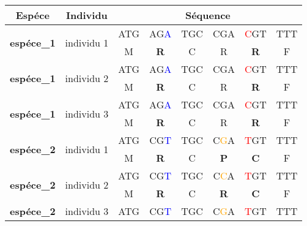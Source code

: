 \documentclass[../main]{subfiles} %
\begin{document}



\begin{table}[]
    \centering
    \begin{tabular}{cccccccc}
        \toprule
        \textbf{Espéce}                     & \textbf{Individu}             & \multicolumn{6}{c}{\textbf{Séquence}} \\
        \midrule
        \multirow{2}{*}{\textbf{espéce\_1}} & \multirow{2}{*}{individu   1} & ATG  & AG\textcolor{blue}{A}  & TGC  & CGA  & \textcolor{red}{C}GT & TTT \\
                                            &                               & M    & \textbf{R}    & C    & R    & \textbf{R}   & F   \\
        \midrule
        \multirow{2}{*}{\textbf{espéce\_1}} & \multirow{2}{*}{individu 2}   & ATG  & AG\textcolor{blue}{A} & TGC  & CGA  & \textcolor{red}{C}GT & TTT \\
                                            &                               & M    & \textbf{R}    & C    & R    & \textbf{R}   & F   \\
        \midrule
        \multirow{2}{*}{\textbf{espéce\_1}} & \multirow{2}{*}{individu 3}   & ATG  & AG\textcolor{blue}{A}  & TGC  & CGA  & \textcolor{red}{C}GT & TTT \\
                                            &                               & M    & \textbf{R}    & C    & R    & \textbf{R}   & F   \\
        \midrule
        \multirow{2}{*}{\textbf{espéce\_2}} & \multirow{2}{*}{individu 1}   & ATG  & CG\textcolor{blue}{T}  & TGC  & C\textcolor{orange}{G}A  & \textcolor{red}{T}GT & TTT \\
                                            &                               & M    & \textbf{R}    & C    & \textbf{P}    & \textbf{C}   & F   \\
        \midrule
        \multirow{2}{*}{\textbf{espéce\_2}} & \multirow{2}{*}{individu 2}   & ATG  & CG\textcolor{blue}{T}  & TGC  & C\textcolor{orange}{C}A  & \textcolor{red}{T}GT & TTT \\
                                            &                               & M    & \textbf{R}    & C    & \textbf{R}    & \textbf{C}   & F   \\
        \midrule
        \multirow{2}{*}{\textbf{espéce\_2}} & \multirow{2}{*}{individu 3}   & ATG  & CG\textcolor{blue}{T}  & TGC  & C\textcolor{orange}{G}A  & \textcolor{red}{T}GT & TTT \\

\end{tabular}
\end{table}
\end{document}
